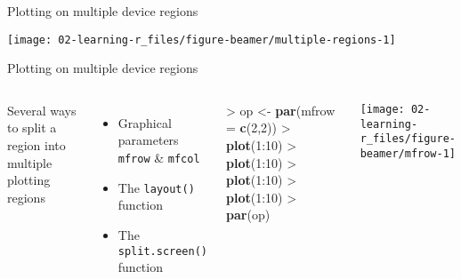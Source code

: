 \documentclass[10pt,ignorenonframetext,compress, aspectratio=169]{beamer}
\newenvironment{Shaded}{\begin{snugshade}}{\end{snugshade}}
\newcommand{\KeywordTok}[1]{\textcolor[rgb]{0.13,0.29,0.53}{\textbf{{#1}}}}
\newcommand{\DataTypeTok}[1]{\textcolor[rgb]{0.13,0.29,0.53}{{#1}}}
\newcommand{\DecValTok}[1]{\textcolor[rgb]{0.00,0.00,0.81}{{#1}}}
\newcommand{\StringTok}[1]{\textcolor[rgb]{0.31,0.60,0.02}{{#1}}}
\newcommand{\NormalTok}[1]{{#1}}
\providecommand{\tightlist}{%
  \setlength{\itemsep}{0pt}\setlength{\parskip}{0pt}}
\newcommand{\columnsbegin}{\begin{columns}}
\newcommand{\columnsend}{\end{columns}}
\begin{document}
\begin{frame}{Plotting on multiple device regions}

\begin{center}\texttt{[image: 02-learning-r\_files/figure-beamer/multiple-regions-1]} \end{center}

\end{frame}

\begin{frame}[fragile]{Plotting on multiple device regions}

\columnsbegin
{}

Several ways to split a region into multiple plotting regions

\begin{itemize}
\tightlist
\item
  Graphical parameters \texttt{mfrow} \& \texttt{mfcol}
\item
  The \texttt{layout()} function
\item
  The \texttt{split.screen()} function
\end{itemize}


\begin{Shaded}
\begin{Highlighting}[]
\NormalTok{>}\StringTok{ }\NormalTok{op <-}\StringTok{ }\KeywordTok{par}\NormalTok{(}\DataTypeTok{mfrow =} \KeywordTok{c}\NormalTok{(}\DecValTok{2}\NormalTok{,}\DecValTok{2}\NormalTok{))}
\NormalTok{>}\StringTok{ }\KeywordTok{plot}\NormalTok{(}\DecValTok{1}\NormalTok{:}\DecValTok{10}\NormalTok{)}
\NormalTok{>}\StringTok{ }\KeywordTok{plot}\NormalTok{(}\DecValTok{1}\NormalTok{:}\DecValTok{10}\NormalTok{)}
\NormalTok{>}\StringTok{ }\KeywordTok{plot}\NormalTok{(}\DecValTok{1}\NormalTok{:}\DecValTok{10}\NormalTok{)}
\NormalTok{>}\StringTok{ }\KeywordTok{plot}\NormalTok{(}\DecValTok{1}\NormalTok{:}\DecValTok{10}\NormalTok{)}
\NormalTok{>}\StringTok{ }\KeywordTok{par}\NormalTok{(op)}
\end{Highlighting}
\end{Shaded}

\begin{center}\texttt{[image: 02-learning-r\_files/figure-beamer/mfrow-1]} \end{center}

\columnsend

\end{frame}
\end{document}
